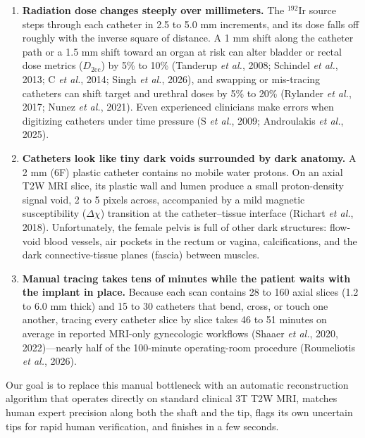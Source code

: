 \documentclass[
  11pt,
]{article}
\providecommand{\tightlist}{%
  \setlength{\itemsep}{0pt}\setlength{\parskip}{0pt}}
\begin{document}
\begin{enumerate}
\def\labelenumi{\arabic{enumi}.}
\tightlist
\item
  \textbf{Radiation dose changes steeply over millimeters.} The
  \(^{192}\text{Ir}\) source steps through each catheter in 2.5 to 5.0
  mm increments, and its dose falls off roughly with the inverse square
  of distance. A 1 mm shift along the catheter path or a 1.5 mm shift
  toward an organ at risk can alter bladder or rectal dose metrics
  (\(D_{2\text{cc}}\)) by 5\% to 10\% (Tanderup \emph{et al.}, 2008;
  Schindel \emph{et al.}, 2013; C \emph{et al.}, 2014; Singh \emph{et
  al.}, 2026), and swapping or mis-tracing catheters can shift target
  and urethral doses by 5\% to 20\% (Rylander \emph{et al.}, 2017; Nunez
  \emph{et al.}, 2021). Even experienced clinicians make errors when
  digitizing catheters under time pressure (S \emph{et al.}, 2009;
  Androulakis \emph{et al.}, 2025).
\item
  \textbf{Catheters look like tiny dark voids surrounded by dark
  anatomy.} A 2 mm (6F) plastic catheter contains no mobile water
  protons. On an axial T2W MRI slice, its plastic wall and lumen produce
  a small proton-density signal void, 2 to 5 pixels across, accompanied
  by a mild magnetic susceptibility (\(\Delta\chi\)) transition at the
  catheter--tissue interface (Richart \emph{et al.}, 2018).
  Unfortunately, the female pelvis is full of other dark structures:
  flow-void blood vessels, air pockets in the rectum or vagina,
  calcifications, and the dark connective-tissue planes (fascia) between
  muscles.
\item
  \textbf{Manual tracing takes tens of minutes while the patient waits
  with the implant in place.} Because each scan contains 28 to 160 axial
  slices (1.2 to 6.0 mm thick) and 15 to 30 catheters that bend, cross,
  or touch one another, tracing every catheter slice by slice takes 46
  to 51 minutes on average in reported MRI-only gynecologic workflows
  (Shaaer \emph{et al.}, 2020, 2022)---nearly half of the 100-minute
  operating-room procedure (Roumeliotis \emph{et al.}, 2026).
\end{enumerate}

Our goal is to replace this manual bottleneck with an automatic
reconstruction algorithm that operates directly on standard clinical 3T
T2W MRI, matches human expert precision along both the shaft and the
tip, flags its own uncertain tips for rapid human verification, and
finishes in a few seconds.
\end{document}
